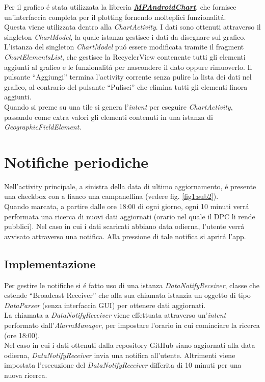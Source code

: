 \documentclass{article}
\newcommand{\quotes}[1]{``#1''}
\begin{document}
    Per il grafico é stata utilizzata la libreria \href{https://github.com/PhilJay/MPAndroidChart}{\emph{\textbf{MPAndroidChart}}}, 
    che fornisce un'interfaccia completa per il plotting fornendo molteplici funzionalitá.
    \\
    Questa viene utilizzata dentro alla \emph{ChartActivity}. I dati sono ottenuti attraverso il singleton \emph{ChartModel}, la quale istanza gestisce i dati da disegnare sul grafico.
    L'istanza del singleton \emph{ChartModel} puó essere modificata tramite il fragment \emph{ChartElementsList}, che gestisce la RecyclerView contenente tutti gli elementi aggiunti al grafico e le funzionalitá per nascondere il dato oppure rimuoverlo.
    Il pulsante \quotes{Aggiungi} termina l'activity corrente senza pulire la lista dei dati nel grafico, al contrario del pulsante \quotes{Pulisci} che elimina tutti gli elementi finora aggiunti.
    \\
    Quando si preme su una tile si genera l'\emph{intent} per eseguire \emph{ChartActivity}, passando come extra valori gli elementi contenuti in una istanza di \emph{GeographicFieldElement}.

    \section{Notifiche periodiche}
    Nell'activity principale, a sinistra della data di ultimo aggiornamento, é presente una checkbox con a fianco una campanellina (vedere fig. \ref{fig1:sub2}).
    \\
    Quando marcata, a partire dalle ore 18:00 di ogni giorno, ogni 10 minuti verrá performata una ricerca di nuovi dati aggiornati (orario nel quale il DPC li rende pubblici).
    Nel caso in cui i dati scaricati abbiano data odierna, l'utente verrá avvisato attraverso una notifica. Alla pressione di tale notifica si aprirá l'app.

    \subsection{Implementazione}
    
    Per gestire le notifiche si é fatto uso di una istanza \emph{DataNotifyReceiver}, classe che estende \quotes{Broadcast Receiver}
    che alla sua chiamata istanzia un oggetto di tipo \emph{DataParser} (senza interfaccia GUI) per ottenere dati aggiornati.
    \\
    La chiamata a \emph{DataNotifyReceiver} viene effettuata attraverso un'\emph{intent} performato dall'\emph{AlarmManager}, per impostare l'orario in cui cominciare la ricerca (ore 18:00).
    \\
    Nel caso in cui i dati ottenuti dalla repository GitHub siano aggiornati alla data odierna, \emph{DataNotifyReceiver} invia una notifica all'utente.
    Altrimenti viene impostata l'esecuzione del \emph{DataNotifyReceiver} differita di 10 minuti per una nuova ricerca.
\end{document}
